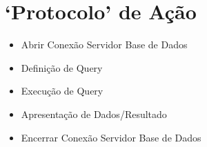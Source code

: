 \vfill
\section{`Protocolo' de Ação}
 \begin{itemize}
     \item Abrir Conexão Servidor Base de Dados
     \item Definição de Query
     \item Execução de Query
     \item Apresentação de Dados/Resultado
     \item Encerrar Conexão Servidor Base de Dados
 \end{itemize}